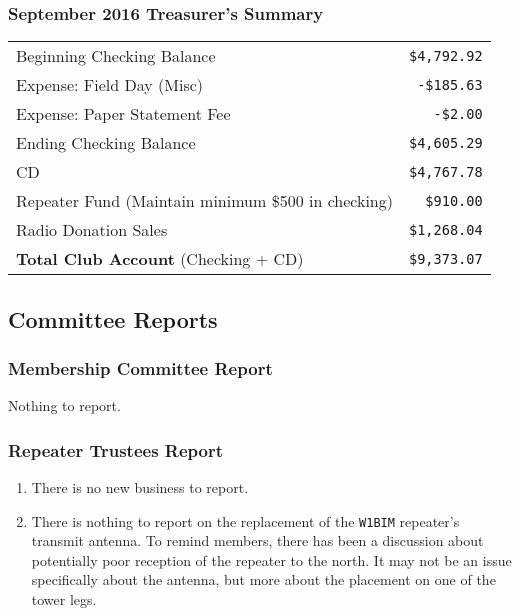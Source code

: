 \documentclass[10pt,letterpaper]{article}
\begin{document}
\subsubsection{September 2016 Treasurer's Summary}
\noindent
\begin{tabular}{|l|r|}
  \hline
  Beginning Checking Balance & \texttt{\$4,792.92} \\
  Expense: Field Day (Misc) & \texttt{-\$185.63} \\
  Expense: Paper Statement Fee & \texttt{-\$2.00} \\
  Ending Checking Balance & \texttt{\$4,605.29} \\
  \hline
  \hline
  CD & \texttt{\$4,767.78} \\
  \hline
  \hline
  Repeater Fund (Maintain minimum \$500 in checking) & \texttt{\$910.00} \\
  \hline
  \hline
  Radio Donation Sales & \texttt{\$1,268.04} \\
  \hline
  \hline
  \textbf{Total Club Account} (Checking + CD) & \texttt{\$9,373.07} \\
  \hline
\end{tabular}

\subsection{Committee Reports}

\subsubsection{Membership Committee Report}

Nothing to report.

\subsubsection{Repeater Trustees Report}

\begin{enumerate}
\item There is no new business to report.
\item There is nothing to report on the replacement of the \texttt{W1BIM} repeater's transmit antenna. To remind members, there has been a discussion about potentially poor reception of the repeater to the north. It may not be an issue specifically about the antenna, but more about the placement on one of the tower legs.
\end{enumerate}
\end{document}
